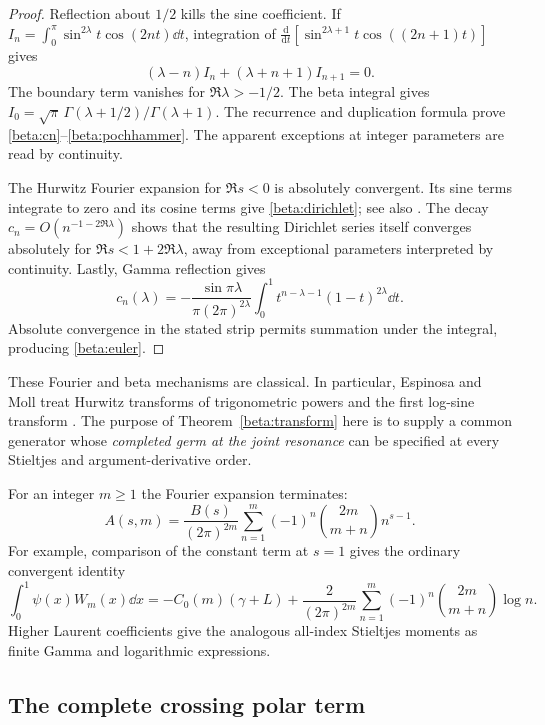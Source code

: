 \begin{proof}
Reflection about $1/2$ kills the sine coefficient. If
$I_n=\int_0^\pi\sin^{2\lambda}t\cos(2nt)\dd t$, integration of
$\frac{\mathrm d}{\mathrm dt}
 [\sin^{2\lambda+1}t\cos((2n+1)t)]$ gives
\[
 (\lambda-n)I_n+(\lambda+n+1)I_{n+1}=0.
\]
The boundary term vanishes for $\Re\lambda>-1/2$.
The beta integral gives
$I_0=\sqrt\pi\,\Gamma(\lambda+1/2)/\Gamma(\lambda+1)$.
The recurrence and duplication formula prove
\eqref{beta:cn}--\eqref{beta:pochhammer}. The apparent exceptions at
integer parameters are read by continuity.

The Hurwitz Fourier expansion for $\Re s<0$ is absolutely convergent.
Its sine terms integrate to zero and its cosine terms give
\eqref{beta:dirichlet}; see also \cite[\S25.11]{DLMFHurwitz}.
The decay $c_n=O(n^{-1-2\Re\lambda})$ shows that the resulting
Dirichlet series itself converges absolutely for
$\Re s<1+2\Re\lambda$, away from exceptional parameters interpreted
by continuity. Lastly, Gamma reflection gives
\[
 c_n(\lambda)=-\frac{\sin\pi\lambda}{\pi(2\pi)^{2\lambda}}
 \int_0^1t^{n-\lambda-1}(1-t)^{2\lambda}\dd t.
\]
Absolute convergence in the stated strip permits summation under the
integral, producing \eqref{beta:euler}.
\end{proof}

These Fourier and beta mechanisms are classical. In particular,
Espinosa and Moll treat Hurwitz transforms of trigonometric powers
and the first log-sine transform \cite[\S\S5,13]{EspinosaMoll}.
The purpose of Theorem~\ref{beta:transform} here is to supply a common
generator whose \emph{completed germ at the joint resonance} can be
specified at every Stieltjes and argument-derivative order.

For an integer $m\geq1$ the Fourier expansion terminates:
\begin{equation}\label{beta:integer}
 A(s,m)=\frac{B(s)}{(2\pi)^{2m}}
 \sum_{n=1}^m(-1)^n\binom{2m}{m+n}n^{s-1}.
\end{equation}
For example, comparison of the constant term at $s=1$ gives the
ordinary convergent identity
\begin{equation}\label{beta:psiinteger}
 \int_0^1\psi(x)W_m(x)\dd x
 =-C_0(m)(\gamma+L)
 +\frac{2}{(2\pi)^{2m}}
   \sum_{n=1}^m(-1)^n\binom{2m}{m+n}\log n.
\end{equation}
Higher Laurent coefficients give the analogous all-index Stieltjes
moments as finite Gamma and logarithmic expressions.

\subsection{The complete crossing polar term}

